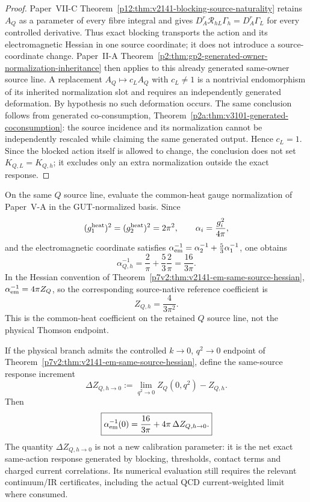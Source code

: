 \documentclass[12pt,a4paper]{article}
\begin{document}
\begin{proof}
Paper~VII-C Theorem~\ref{p12:thm:v2141-blocking-source-naturality} retains
$A_Q$ as a parameter of every fibre integral and gives
$D_A^r\mathscr R_{hL}\Gamma_h=D_A^r\Gamma_L$ for every controlled derivative.
Thus exact blocking transports the action and its electromagnetic Hessian in
one source coordinate; it does not introduce a source-coordinate change.
Paper~II-A Theorem~\ref{p2:thm:gp2-generated-owner-normalization-inheritance}
then applies to this already generated same-owner source line.  A replacement
$A_Q\mapsto c_LA_Q$ with $c_L\neq1$ is a nontrivial endomorphism of its inherited
normalization slot and requires an independently generated deformation.
By hypothesis no such deformation occurs.  The same conclusion follows from
generated co-consumption,
Theorem~\ref{p2a:thm:v3101-generated-coconsumption}: the source incidence and
its normalization cannot be independently rescaled while claiming the same
generated output.  Hence $c_L=1$.  Since the blocked action itself is allowed
to change, the conclusion does not set $K_{Q,L}=K_{Q,h}$; it excludes only an
extra normalization outside the exact response.
\end{proof}

\begin{corollary}
\label{p5c:cor:v275-em-heat-reference}
On the same $Q$ source line, evaluate the common-heat gauge normalization of
Paper~V-A in the GUT-normalized basis.  Since
\[
 (g_1^{\rm heat})^2=(g_2^{\rm heat})^2=2\pi^2,
 \qquad
 \alpha_i=\frac{g_i^2}{4\pi},
\]
and the electromagnetic coordinate satisfies
$\alpha_{\rm em}^{-1}=\alpha_2^{-1}+\frac53\alpha_1^{-1}$, one obtains
\[
 \boxed{
 \alpha_{Q,h}^{-1}
 =\frac2\pi+\frac53\frac2\pi
 =\frac{16}{3\pi}.}
\]
In the Hessian convention of
Theorem~\ref{p7v2:thm:v2141-em-same-source-hessian},
$\alpha_{\rm em}^{-1}=4\pi Z_Q$, so the corresponding source-native reference
coefficient is
\[
 \boxed{Z_{Q,h}=\frac{4}{3\pi^2}.}
\]
This is the common-heat coefficient on the retained $Q$ source line, not the
physical Thomson endpoint.
\end{corollary}

\begin{corollary}
\label{p5c:cor:v275-g17-endpoint-identity}
If the physical branch admits the controlled $k\to0$, $q^2\to0$ endpoint of
Theorem~\ref{p7v2:thm:v2141-em-same-source-hessian}, define the same-source
response increment
\[
 \Delta Z_{Q,h\to0}
 :=\lim_{q^2\to0}Z_Q(0,q^2)-Z_{Q,h}.
\]
Then
\[
 \boxed{
 \alpha_{\rm em}^{-1}(0)
 =\frac{16}{3\pi}+4\pi\,\Delta Z_{Q,h\to0}.}
\]
The quantity $\Delta Z_{Q,h\to0}$ is not a new calibration parameter: it is the
net exact same-action response generated by blocking, thresholds, contact
terms and charged current correlations.  Its numerical evaluation still
requires the relevant continuum/IR certificates, including the actual QCD
current-weighted limit where consumed.
\end{corollary}
\end{document}
